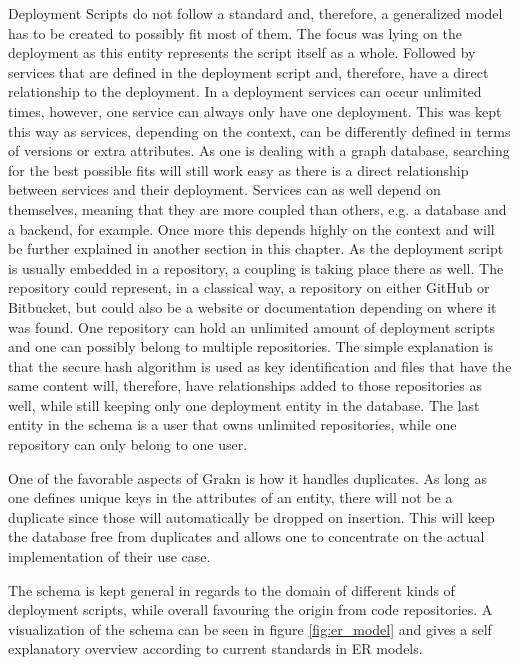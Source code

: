 Deployment Scripts do not follow a standard and, therefore, a generalized model has to be created to possibly fit most of them. The focus was lying on the deployment as this entity represents the script itself as a whole.  Followed by services that are defined in the deployment script and, therefore, have a direct relationship to the deployment. In a deployment services can occur unlimited times, however, one service can always only have one deployment. This was kept this way as services, depending on the context, can be differently defined in terms of versions or extra attributes. As one is dealing with a graph database, searching for the best possible fits will still work easy as there is a direct relationship between services and their deployment.
Services can as well depend on themselves, meaning that they are more coupled than others, e.g. a database and a backend, for example. Once more this depends highly on the context and will be further explained in another section in this chapter. 
As the deployment script is usually embedded in a repository, a coupling is taking place there as well. The repository could represent, in a classical way, a repository on either GitHub or Bitbucket, but could also be a website or documentation depending on where it was found. One repository can hold an unlimited amount of deployment scripts and one can possibly belong to multiple repositories. The simple explanation is that the secure hash algorithm is used as key identification and files that have the same content will, therefore, have relationships added to those repositories as well, while still keeping only one deployment entity in the database. The last entity in the schema is a user that owns unlimited repositories, while one repository can only belong to one user.

One of the favorable aspects of Grakn is how it handles duplicates. As long as one defines unique keys in the attributes of an entity, there will not be a duplicate since those will automatically be dropped on insertion. This will keep the database free from duplicates and allows one to concentrate on the actual implementation of their use case.

The schema is kept general in regards to the domain of different kinds of deployment scripts, while overall favouring the origin from code repositories. A visualization of the schema can be seen in figure \ref{fig:er_model} and gives a self explanatory overview according to current standards in ER models.

